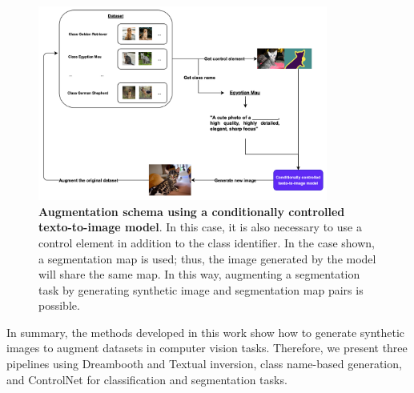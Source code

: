 \begin{figure}
    \centering
    \includegraphics[width=0.85\textwidth]{Pictures/controlNetPipe.png} 
    \caption{\textbf{Augmentation schema using a conditionally controlled texto-to-image model}. In this case, it is also necessary to use a control element in addition to the class identifier. In the case shown, a segmentation map is used; thus, the image generated by the model will share the same map. In this way, augmenting a segmentation task by generating synthetic image and segmentation map pairs is possible.}
    \label{fig:controlNetPipe}
\end{figure}

In summary, the methods developed in this work show how to generate synthetic images to augment datasets in computer vision tasks. Therefore, we present three pipelines using Dreambooth and Textual inversion, class name-based generation, and ControlNet for classification and segmentation tasks.